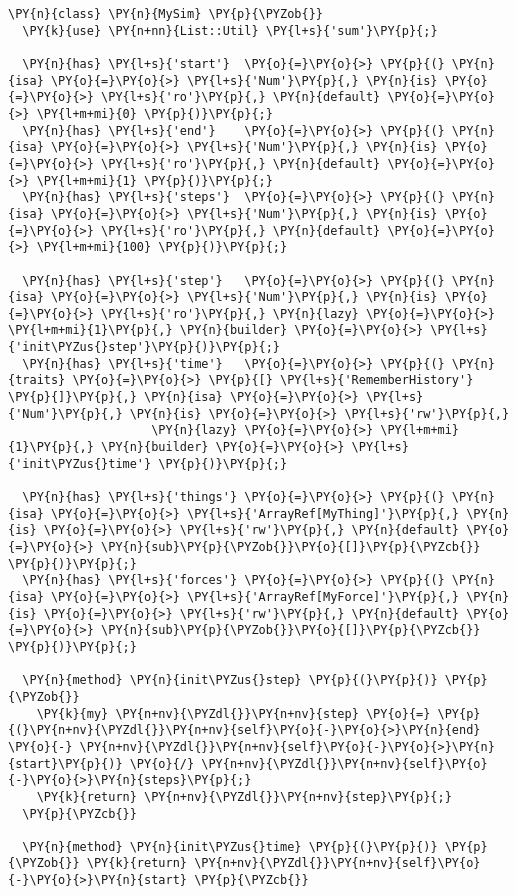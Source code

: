 \begin{Verbatim}[commandchars=\\\{\}]
\PY{n}{class} \PY{n}{MySim} \PY{p}{\PYZob{}}
  \PY{k}{use} \PY{n+nn}{List::Util} \PY{l+s}{'sum'}\PY{p}{;}

  \PY{n}{has} \PY{l+s}{'start'}  \PY{o}{=}\PY{o}{>} \PY{p}{(} \PY{n}{isa} \PY{o}{=}\PY{o}{>} \PY{l+s}{'Num'}\PY{p}{,} \PY{n}{is} \PY{o}{=}\PY{o}{>} \PY{l+s}{'ro'}\PY{p}{,} \PY{n}{default} \PY{o}{=}\PY{o}{>} \PY{l+m+mi}{0} \PY{p}{)}\PY{p}{;}
  \PY{n}{has} \PY{l+s}{'end'}    \PY{o}{=}\PY{o}{>} \PY{p}{(} \PY{n}{isa} \PY{o}{=}\PY{o}{>} \PY{l+s}{'Num'}\PY{p}{,} \PY{n}{is} \PY{o}{=}\PY{o}{>} \PY{l+s}{'ro'}\PY{p}{,} \PY{n}{default} \PY{o}{=}\PY{o}{>} \PY{l+m+mi}{1} \PY{p}{)}\PY{p}{;}
  \PY{n}{has} \PY{l+s}{'steps'}  \PY{o}{=}\PY{o}{>} \PY{p}{(} \PY{n}{isa} \PY{o}{=}\PY{o}{>} \PY{l+s}{'Num'}\PY{p}{,} \PY{n}{is} \PY{o}{=}\PY{o}{>} \PY{l+s}{'ro'}\PY{p}{,} \PY{n}{default} \PY{o}{=}\PY{o}{>} \PY{l+m+mi}{100} \PY{p}{)}\PY{p}{;}

  \PY{n}{has} \PY{l+s}{'step'}   \PY{o}{=}\PY{o}{>} \PY{p}{(} \PY{n}{isa} \PY{o}{=}\PY{o}{>} \PY{l+s}{'Num'}\PY{p}{,} \PY{n}{is} \PY{o}{=}\PY{o}{>} \PY{l+s}{'ro'}\PY{p}{,} \PY{n}{lazy} \PY{o}{=}\PY{o}{>} \PY{l+m+mi}{1}\PY{p}{,} \PY{n}{builder} \PY{o}{=}\PY{o}{>} \PY{l+s}{'init\PYZus{}step'}\PY{p}{)}\PY{p}{;}
  \PY{n}{has} \PY{l+s}{'time'}   \PY{o}{=}\PY{o}{>} \PY{p}{(} \PY{n}{traits} \PY{o}{=}\PY{o}{>} \PY{p}{[} \PY{l+s}{'RememberHistory'} \PY{p}{]}\PY{p}{,} \PY{n}{isa} \PY{o}{=}\PY{o}{>} \PY{l+s}{'Num'}\PY{p}{,} \PY{n}{is} \PY{o}{=}\PY{o}{>} \PY{l+s}{'rw'}\PY{p}{,} 
                    \PY{n}{lazy} \PY{o}{=}\PY{o}{>} \PY{l+m+mi}{1}\PY{p}{,} \PY{n}{builder} \PY{o}{=}\PY{o}{>} \PY{l+s}{'init\PYZus{}time'} \PY{p}{)}\PY{p}{;}

  \PY{n}{has} \PY{l+s}{'things'} \PY{o}{=}\PY{o}{>} \PY{p}{(} \PY{n}{isa} \PY{o}{=}\PY{o}{>} \PY{l+s}{'ArrayRef[MyThing]'}\PY{p}{,} \PY{n}{is} \PY{o}{=}\PY{o}{>} \PY{l+s}{'rw'}\PY{p}{,} \PY{n}{default} \PY{o}{=}\PY{o}{>} \PY{n}{sub}\PY{p}{\PYZob{}}\PY{o}{[]}\PY{p}{\PYZcb{}} \PY{p}{)}\PY{p}{;}
  \PY{n}{has} \PY{l+s}{'forces'} \PY{o}{=}\PY{o}{>} \PY{p}{(} \PY{n}{isa} \PY{o}{=}\PY{o}{>} \PY{l+s}{'ArrayRef[MyForce]'}\PY{p}{,} \PY{n}{is} \PY{o}{=}\PY{o}{>} \PY{l+s}{'rw'}\PY{p}{,} \PY{n}{default} \PY{o}{=}\PY{o}{>} \PY{n}{sub}\PY{p}{\PYZob{}}\PY{o}{[]}\PY{p}{\PYZcb{}} \PY{p}{)}\PY{p}{;}

  \PY{n}{method} \PY{n}{init\PYZus{}step} \PY{p}{(}\PY{p}{)} \PY{p}{\PYZob{}}
    \PY{k}{my} \PY{n+nv}{\PYZdl{}}\PY{n+nv}{step} \PY{o}{=} \PY{p}{(}\PY{n+nv}{\PYZdl{}}\PY{n+nv}{self}\PY{o}{-}\PY{o}{>}\PY{n}{end} \PY{o}{-} \PY{n+nv}{\PYZdl{}}\PY{n+nv}{self}\PY{o}{-}\PY{o}{>}\PY{n}{start}\PY{p}{)} \PY{o}{/} \PY{n+nv}{\PYZdl{}}\PY{n+nv}{self}\PY{o}{-}\PY{o}{>}\PY{n}{steps}\PY{p}{;}
    \PY{k}{return} \PY{n+nv}{\PYZdl{}}\PY{n+nv}{step}\PY{p}{;}
  \PY{p}{\PYZcb{}}

  \PY{n}{method} \PY{n}{init\PYZus{}time} \PY{p}{(}\PY{p}{)} \PY{p}{\PYZob{}} \PY{k}{return} \PY{n+nv}{\PYZdl{}}\PY{n+nv}{self}\PY{o}{-}\PY{o}{>}\PY{n}{start} \PY{p}{\PYZcb{}}
\end{Verbatim}
